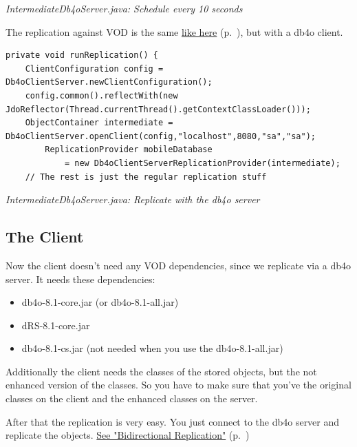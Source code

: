 {\small\itshape IntermediateDb4oServer.java: Schedule every 10 seconds\par}
\medskip

The replication against VOD is the same \hyperref[drs:db4o-replication-system-drs-vod-vod-replication]{like here} (p.~\pageref{drs:db4o-replication-system-drs-vod-vod-replication}), but with a db4o client.

\begin{lstlisting}
private void runReplication() {
    ClientConfiguration config = Db4oClientServer.newClientConfiguration();
    config.common().reflectWith(new JdoReflector(Thread.currentThread().getContextClassLoader()));
    ObjectContainer intermediate = Db4oClientServer.openClient(config,"localhost",8080,"sa","sa");
        ReplicationProvider mobileDatabase
            = new Db4oClientServerReplicationProvider(intermediate);
    // The rest is just the regular replication stuff
\end{lstlisting}

{\small\itshape IntermediateDb4oServer.java: Replicate with the db4o server\par}
\medskip

\subsection{The Client}
\label{drs:db4o-replication-system-drs-vod-replicating-to-mobile-device:client}

Now the client doesn't need any VOD dependencies, since we replicate via a db4o server. It needs these dependencies:

\begin{itemize}
\item db4o-8.1-core.jar (or db4o-8.1-all.jar)
\item dRS-8.1-core.jar
\item db4o-8.1-cs.jar (not needed when you use the db4o-8.1-all.jar)
\end{itemize}

Additionally the client needs the classes of the stored objects, but the not enhanced version of the classes. So you have to make sure that you've the original classes on the client and the enhanced classes on the server.

After that the replication is very easy. You just connect to the db4o server and replicate the objects. \hyperref[drs:db4o-replication-system-drs-db4o-databases-replication-bi-directional-replication]{See "Bidirectional Replication"} (p.~\pageref{drs:db4o-replication-system-drs-db4o-databases-replication-bi-directional-replication})

